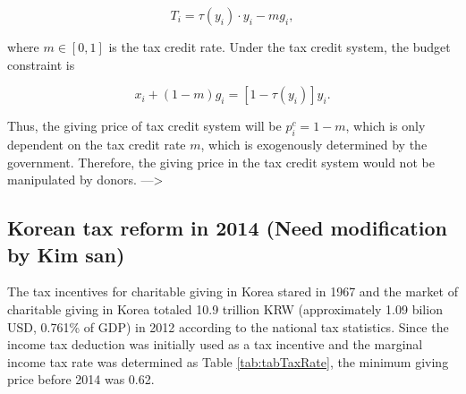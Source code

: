 \documentclass[ review  , 3p ]{elsarticle}
\begin{document}
  \[
      T_i = \tau(y_i)\cdot y_i - m g_i,
  \]

  where \(m \in [0, 1]\) is the tax credit rate. Under the tax credit system, the budget constraint is

  \[
      x_i + (1 - m) g_i = [1 - \tau(y_i)] y_i.
  \]

  Thus, the giving price of tax credit system will be \(p_i^c = 1 - m\), which is only dependent on the tax credit rate \(m\), which is exogenously determined by the government.
  Therefore, the giving price in the tax credit system would not be manipulated by donors.
  ---\textgreater{}

  \hypertarget{korean-tax-reform-in-2014-need-modification-by-kim-san}{%
  \subsection{Korean tax reform in 2014 (Need modification by Kim san)}\label{korean-tax-reform-in-2014-need-modification-by-kim-san}}

  The tax incentives for charitable giving in Korea stared in 1967 and the market of charitable giving in Korea totaled 10.9 trillion KRW (approximately 1.09 bilion USD, 0.761\% of GDP) in 2012 according to the national tax statistics.
  Since the income tax deduction was initially used as a tax incentive and the marginal income tax rate was determined as Table \ref{tab:tabTaxRate}, the minimum giving price before 2014 was 0.62.
\end{document}
